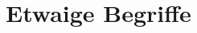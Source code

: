 \documentclass[ngerman]{report}
\theoremstyle{plain}%
\theoremstyle{definition}%
\theoremstyle{myStyle}
\begin{document}
\appendix 

\chapter{Etwaige Begriffe}
	
%	
%	
%		
%		

\glsaddall

\printnoidxglossary

	
\end{document}
